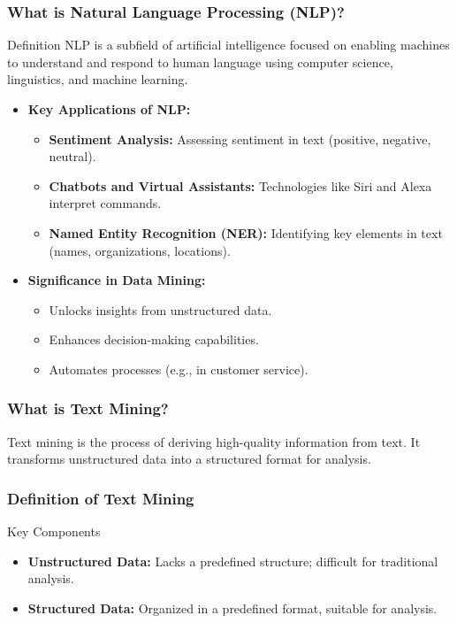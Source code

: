 \documentclass[aspectratio=169]{beamer}
\begin{document}
\begin{frame}[fragile]
    \frametitle{What is Natural Language Processing (NLP)?}
    \begin{block}{Definition}
        NLP is a subfield of artificial intelligence focused on enabling machines to understand and respond to human language using computer science, linguistics, and machine learning.
    \end{block}

    \begin{itemize}
        \item \textbf{Key Applications of NLP:}
        \begin{itemize}
            \item \textbf{Sentiment Analysis:} Assessing sentiment in text (positive, negative, neutral).
            \item \textbf{Chatbots and Virtual Assistants:} Technologies like Siri and Alexa interpret commands.
            \item \textbf{Named Entity Recognition (NER):} Identifying key elements in text (names, organizations, locations).
        \end{itemize}
        
        \item \textbf{Significance in Data Mining:}
        \begin{itemize}
            \item Unlocks insights from unstructured data.
            \item Enhances decision-making capabilities.
            \item Automates processes (e.g., in customer service).
        \end{itemize}
    \end{itemize}
\end{frame}

\begin{frame}[fragile]
    \frametitle{What is Text Mining?}
    Text mining is the process of deriving high-quality information from text. It transforms unstructured data into a structured format for analysis.
\end{frame}

\begin{frame}[fragile]
    \frametitle{Definition of Text Mining}
    \begin{block}{Key Components}
        \begin{itemize}
            \item \textbf{Unstructured Data:} Lacks a predefined structure; difficult for traditional analysis.
            \item \textbf{Structured Data:} Organized in a predefined format, suitable for analysis.
        \end{itemize}
    \end{block}
\end{frame}
\end{document}
